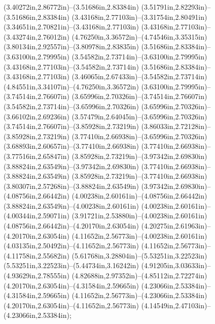 (3.40272in,2.86772in)--(3.51686in,2.83384in) (3.51791in,2.82293in)--(3.51686in,2.83384in) (3.43168in,2.77103in)--(3.31754in,2.80491in) (3.34651in,2.70821in)--(3.43168in,2.77103in) (3.43168in,2.77103in)--(3.43274in,2.76012in) (4.76250in,3.36572in)--(4.74546in,3.35315in) (3.80134in,2.92557in)--(3.80978in,2.83835in) (3.51686in,2.83384in)--(3.63100in,2.79995in) (3.54582in,2.73714in)--(3.63100in,2.79995in) (3.43168in,2.77103in)--(3.54582in,2.73714in) (3.51686in,2.83384in)--(3.43168in,2.77103in) (3.46065in,2.67433in)--(3.54582in,2.73714in) (4.84551in,3.34107in)--(4.76250in,3.36572in) (3.63100in,2.79995in)--(3.74514in,2.76607in) (3.65996in,2.70326in)--(3.74514in,2.76607in) (3.54582in,2.73714in)--(3.65996in,2.70326in) (3.65996in,2.70326in)--(3.66102in,2.69236in) (3.57479in,2.64045in)--(3.65996in,2.70326in) (3.74514in,2.76607in)--(3.85928in,2.73219in) (3.86033in,2.72128in)--(3.85928in,2.73219in) (3.77410in,2.66938in)--(3.65996in,2.70326in) (3.68893in,2.60657in)--(3.77410in,2.66938in) (3.77410in,2.66938in)--(3.77516in,2.65847in) (3.85928in,2.73219in)--(3.97342in,2.69830in) (3.88824in,2.63549in)--(3.97342in,2.69830in) (3.77410in,2.66938in)--(3.88824in,2.63549in) (3.85928in,2.73219in)--(3.77410in,2.66938in) (3.80307in,2.57268in)--(3.88824in,2.63549in) (3.97342in,2.69830in)--(4.08756in,2.66442in) (4.00238in,2.60161in)--(4.08756in,2.66442in) (3.88824in,2.63549in)--(4.00238in,2.60161in) (4.00238in,2.60161in)--(4.00344in,2.59071in) (3.91721in,2.53880in)--(4.00238in,2.60161in) (4.08756in,2.66442in)--(4.20170in,2.63054in) (4.20275in,2.61963in)--(4.20170in,2.63054in) (4.11652in,2.56773in)--(4.00238in,2.60161in) (4.03135in,2.50492in)--(4.11652in,2.56773in) (4.11652in,2.56773in)--(4.11758in,2.55682in) (5.61768in,3.28804in)--(5.53251in,3.22523in) (5.53251in,3.22523in)--(5.44734in,3.16242in) (4.91205in,3.03633in)--(4.93629in,2.78555in) (4.82688in,2.97352in)--(4.85112in,2.72274in) (4.20170in,2.63054in)--(4.31584in,2.59665in) (4.23066in,2.53384in)--(4.31584in,2.59665in) (4.11652in,2.56773in)--(4.23066in,2.53384in) (4.20170in,2.63054in)--(4.11652in,2.56773in) (4.14549in,2.47103in)--(4.23066in,2.53384in);
